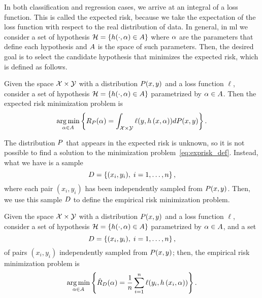 %
In both classification and regression cases, we arrive at an integral of a loss function.
This is called the expected risk, because we take the expectation of the loss function with respect to the real distribution of data. 
%
In general, in \acrshort{ml} we consider a set of hypothesis $\mathcal{H} = \left\{h(\cdot, \alpha) \in A\right\}$ where $\alpha$ are the parameters that define each hypothesis and $A$ is the space of such parameters. Then, the desired goal is to select the candidate hypothesis that minimizes the expected risk, which is defined as follows.
%
\begin{definition}
    Given the space $\mathcal{X} \times \mathcal{Y}$ with a distribution $P(x, y)$ and a loss function $\ell$, consider a set of hypothesis $\mathcal{H} = \left\{h(\cdot, \alpha) \in A\right\}$ parametrized by $\alpha \in A$. Then the expected risk minimization problem is 
    \begin{equation}
        \label{eq:exprisk_def}
        \argmin_{\param \in \paramspace} \left\{ \exprisk(\param) = \int_{\Xspace \times \Yspace} \ell(y, \hyp{x}{\param}) d\distf(x, y) \right\} .
    \end{equation}
\end{definition}
%
The distribution $P$ that appears in the expected risk is unknown, so it is not possible to find a solution to the minimization problem~\eqref{eq:exprisk_def}.
% 
Instead, what we have is a sample 
\begin{equation}
    \nonumber
    D = \left\{(x_i, y_i), \; i=1, \ldots, n\right\} ,
\end{equation}
where each pair $(x_i, y_i)$ has been independently sampled from $P(x, y)$. 
%
Then, we use this sample $D$ to define the empirical risk minimization problem.
%
\begin{definition}
    Given the space $\mathcal{X} \times \mathcal{Y}$ with a distribution $P(x, y)$ and a loss function $\ell$, consider a set of hypothesis $\mathcal{H} = \left\{h(\cdot, \alpha) \in A\right\}$ parametrized by $\alpha \in A$, and a set 
    \begin{equation}
        \nonumber
        D = \left\{(x_i, y_i), \; i=1, \ldots, n\right\} ,
    \end{equation}
    of pairs $(x_i, y_i)$ independently sampled from $P(x, y)$;    
    then, the empirical risk minimization problem is 
    \begin{equation}
        \label{eq:emprisk_def}
        \argmin_{\param \in \paramspace} \left\{ \emprisk(\param) = \frac{1}{\nsamples} \sum_{i=1}^\nsamples \ell(y_i, \hyp{x_i}{\param}) \right\}.
    \end{equation}
\end{definition}
